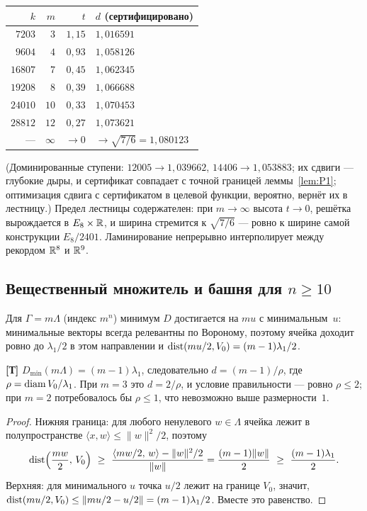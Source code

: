 \begin{center}\small
\begin{tabular}{r r r l}
\toprule
$k$ & $m$ & $t$ & $d$ (сертифицировано)\\
\midrule
$7203$  & $3$  & $1{,}15$ & $1{,}016591$\\
$9604$  & $4$  & $0{,}93$ & $1{,}058126$\\
$16807$ & $7$  & $0{,}45$ & $1{,}062345$\\
$19208$ & $8$  & $0{,}39$ & $1{,}066688$\\
$24010$ & $10$ & $0{,}33$ & $1{,}070453$\\
$28812$ & $12$ & $0{,}27$ & $1{,}073621$\\
\midrule
--- & $\infty$ & $\to0$ & $\to\sqrt{7/6}=1{,}080123$\\
\bottomrule
\end{tabular}
\end{center}

\noindent (Доминированные ступени: $12005\to1{,}039662$, $14406\to1{,}053883$;
их сдвиги --- глубокие дыры, и сертификат совпадает с точной границей
леммы~\ref{lem:P1}; оптимизация сдвига с сертификатом в целевой функции,
вероятно, вернёт их в лестницу.) Предел лестницы содержателен: при
$m\to\infty$ высота $t\to0$, решётка вырождается в $E_8\times\mathbb{R}$, и ширина
стремится к $\sqrt{7/6}$ --- ровно к ширине самой конструкции $E_8/2401$.
Ламинирование непрерывно интерполирует между рекордом $\mathbb{R}^8$ и $\mathbb{R}^9$.

\subsection{Вещественный множитель и башня для $n\ge10$}\label{ssec:tower}

Для $\Gamma=m\Lambda$ (индекс $m^n$) минимум $D$ достигается на $mu$ с
минимальным~$u$: минимальные векторы всегда релевантны по Вороному, поэтому
ячейка доходит ровно до $\lambda_1/2$ в этом направлении и
$\operatorname{dist}(mu/2,V_0)=(m-1)\lambda_1/2$.

\begin{proposition}\label{prop:mult}
\textbf{[Т]} $D_{\min}(m\Lambda)=(m-1)\lambda_1$, следовательно
$d=(m-1)/\rho$, где $\rho=\operatorname{diam} V_0/\lambda_1$. При $m=3$ это $d=2/\rho$, и
условие правильности --- ровно $\rho\le2$; при $m=2$ потребовалось бы
$\rho\le1$, что невозможно выше размерности~$1$.
\end{proposition}

\begin{proof}
Нижняя граница: для любого ненулевого $w\in\Lambda$ ячейка лежит в
полупространстве $\langle x,w\rangle\le\|w\|^2/2$, поэтому
\[
\dist\Bigl(\frac{mw}2,\,V_0\Bigr)\ \ge\
\frac{\langle mw/2,\,w\rangle-\|w\|^2/2}{\|w\|}
=\frac{(m-1)\|w\|}2\ \ge\ \frac{(m-1)\lambda_1}2.
\]
Верхняя: для минимального $u$ точка $u/2$ лежит на границе $V_0$, значит,
$\operatorname{dist}(mu/2,V_0)\le\|mu/2-u/2\|=(m-1)\lambda_1/2$. Вместе это равенство.
\end{proof}


